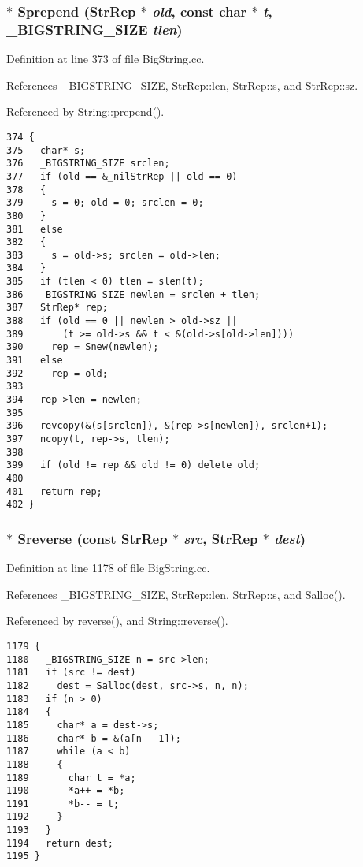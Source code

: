 \subsubsection{$\ast$ Sprepend ({\bf Str\-Rep} $\ast$ {\em old}, const char $\ast$ {\em t}, {\bf \_\-BIGSTRING\_\-SIZE} {\em tlen})}\label{BigString_8cc_a21}




Definition at line 373 of file Big\-String.cc.

References \_\-BIGSTRING\_\-SIZE, Str\-Rep::len, Str\-Rep::s, and Str\-Rep::sz.

Referenced by String::prepend().



\footnotesize\begin{verbatim}374 {
375   char* s;
376   _BIGSTRING_SIZE srclen;
377   if (old == &_nilStrRep || old == 0)
378   {
379     s = 0; old = 0; srclen = 0;
380   }
381   else
382   {
383     s = old->s; srclen = old->len;
384   }
385   if (tlen < 0) tlen = slen(t);
386   _BIGSTRING_SIZE newlen = srclen + tlen;
387   StrRep* rep;
388   if (old == 0 || newlen > old->sz || 
389       (t >= old->s && t < &(old->s[old->len])))
390     rep = Snew(newlen);
391   else
392     rep = old;
393 
394   rep->len = newlen;
395 
396   revcopy(&(s[srclen]), &(rep->s[newlen]), srclen+1);
397   ncopy(t, rep->s, tlen);
398 
399   if (old != rep && old != 0) delete old;
400 
401   return rep;
402 }
\end{verbatim}\normalsize 
{}
\subsubsection{$\ast$ Sreverse (const {\bf Str\-Rep} $\ast$ {\em src}, {\bf Str\-Rep} $\ast$ {\em dest})}\label{BigString_8cc_a34}




Definition at line 1178 of file Big\-String.cc.

References \_\-BIGSTRING\_\-SIZE, Str\-Rep::len, Str\-Rep::s, and Salloc().

Referenced by reverse(), and String::reverse().



\footnotesize\begin{verbatim}1179 {
1180   _BIGSTRING_SIZE n = src->len;
1181   if (src != dest)
1182     dest = Salloc(dest, src->s, n, n);
1183   if (n > 0)
1184   {
1185     char* a = dest->s;
1186     char* b = &(a[n - 1]);
1187     while (a < b)
1188     {
1189       char t = *a;
1190       *a++ = *b;
1191       *b-- = t;
1192     }
1193   }
1194   return dest;
1195 }
\end{verbatim}\normalsize 
{}
